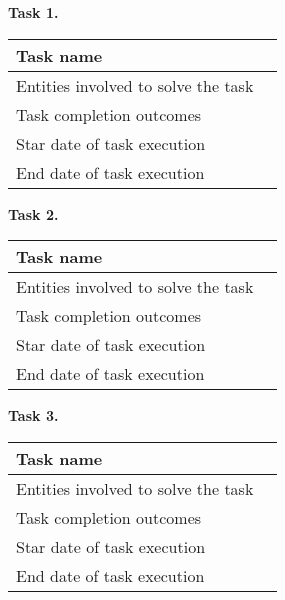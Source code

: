 \begin{description}
    \item \hspace*{8mm}\textbf{Task 1.}\\
    \begin{tabular}{|p{}|p{}|}
        \hline
        Task name                           & \\
        \hline
        Entities involved to solve the task & \\
        \hline
        Task completion outcomes            & \\
        \hline
        Star date of task execution         & \\
        \hline
        End date of task execution          & \\
        \hline
    \end{tabular}
    \item \hspace*{8mm}\textbf{Task 2.}\\
    \begin{tabular}{|p{}|p{}|}
        \hline
        Task name                           & \\
        \hline
        Entities involved to solve the task & \\
        \hline
        Task completion outcomes            & \\
        \hline
        Star date of task execution         & \\
        \hline
        End date of task execution          & \\
        \hline
    \end{tabular}
    \item \hspace*{8mm}\textbf{Task 3.}\\
    \begin{tabular}{|p{}|p{}|}
        \hline
        Task name                           & \\
        \hline
        Entities involved to solve the task & \\
        \hline
        Task completion outcomes            & \\
        \hline
        Star date of task execution         & \\
        \hline
        End date of task execution          & \\
        \hline
    \end{tabular}

\end{description}

